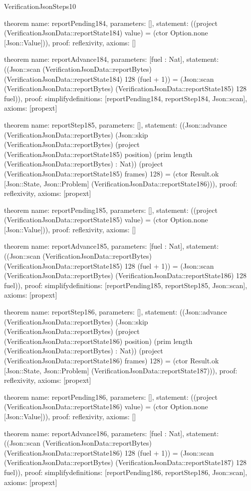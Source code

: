 \begin{lexlean}{VerificationJsonSteps10}
\begin{semanticmodule}
theorem{
  name: reportPending184,
  parameters: [],
  statement: ((project (VerificationJsonData::reportState184) value) = (ctor Option.none [Json::Value])),
  proof: reflexivity{},
  axioms: []
}

theorem{
  name: reportAdvance184,
  parameters: [fuel : Nat],
  statement: ((Json::scan (VerificationJsonData::reportBytes) (VerificationJsonData::reportState184) 128 (fuel + 1)) = (Json::scan (VerificationJsonData::reportBytes) (VerificationJsonData::reportState185) 128 fuel)),
  proof: simplify{definitions: [reportPending184, reportStep184, Json::scan]},
  axioms: [propext]
}

theorem{
  name: reportStep185,
  parameters: [],
  statement: ((Json::advance (VerificationJsonData::reportBytes) (Json::skip (VerificationJsonData::reportBytes) (project (VerificationJsonData::reportState185) position) (prim length (VerificationJsonData::reportBytes) : Nat)) (project (VerificationJsonData::reportState185) frames) 128) = (ctor Result.ok [Json::State, Json::Problem] (VerificationJsonData::reportState186))),
  proof: reflexivity{},
  axioms: [propext]
}

theorem{
  name: reportPending185,
  parameters: [],
  statement: ((project (VerificationJsonData::reportState185) value) = (ctor Option.none [Json::Value])),
  proof: reflexivity{},
  axioms: []
}

theorem{
  name: reportAdvance185,
  parameters: [fuel : Nat],
  statement: ((Json::scan (VerificationJsonData::reportBytes) (VerificationJsonData::reportState185) 128 (fuel + 1)) = (Json::scan (VerificationJsonData::reportBytes) (VerificationJsonData::reportState186) 128 fuel)),
  proof: simplify{definitions: [reportPending185, reportStep185, Json::scan]},
  axioms: [propext]
}

theorem{
  name: reportStep186,
  parameters: [],
  statement: ((Json::advance (VerificationJsonData::reportBytes) (Json::skip (VerificationJsonData::reportBytes) (project (VerificationJsonData::reportState186) position) (prim length (VerificationJsonData::reportBytes) : Nat)) (project (VerificationJsonData::reportState186) frames) 128) = (ctor Result.ok [Json::State, Json::Problem] (VerificationJsonData::reportState187))),
  proof: reflexivity{},
  axioms: [propext]
}

theorem{
  name: reportPending186,
  parameters: [],
  statement: ((project (VerificationJsonData::reportState186) value) = (ctor Option.none [Json::Value])),
  proof: reflexivity{},
  axioms: []
}

theorem{
  name: reportAdvance186,
  parameters: [fuel : Nat],
  statement: ((Json::scan (VerificationJsonData::reportBytes) (VerificationJsonData::reportState186) 128 (fuel + 1)) = (Json::scan (VerificationJsonData::reportBytes) (VerificationJsonData::reportState187) 128 fuel)),
  proof: simplify{definitions: [reportPending186, reportStep186, Json::scan]},
  axioms: [propext]
}


\end{semanticmodule}
\end{lexlean}
